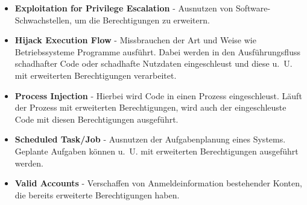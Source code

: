 \documentclass[conference]{IEEEtran}
\begin{document}
\begin{itemize}
    \item \textbf{Exploitation for Privilege Escalation} - Ausnutzen von Software-Schwachstellen, um die Berechtigungen zu erweitern.
    \item \textbf{Hijack Execution Flow} - Missbrauchen der Art und Weise wie Betriebssysteme Programme ausführt. Dabei werden in den Ausführungsfluss schadhafter Code oder schadhafte Nutzdaten eingeschleust und diese u.~U. mit erweiterten Berechtigungen verarbeitet.
    \item \textbf{Process Injection} - Hierbei wird Code in einen Prozess eingeschleust. Läuft der Prozess mit erweiterten Berechtigungen, wird auch der eingeschleuste Code mit diesen Berechtigungen ausgeführt.
    \item \textbf{Scheduled Task/Job} - Ausnutzen der Aufgabenplanung eines Systems. Geplante Aufgaben können u.~U. mit erweiterten Berechtigungen ausgeführt werden.
    \item \textbf{Valid Accounts} - Verschaffen von Anmeldeinformation bestehender Konten, die bereits erweiterte Berechtigungen haben.
\end{itemize}
\end{document}
